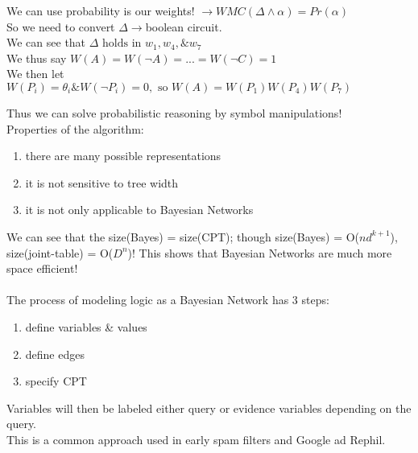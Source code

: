 \documentclass[../../lecture_notes.tex]{subfiles}
\begin{document}
\begin{center}\begin{minipage}{0.2\linewidth}\end{minipage}%
\begin{minipage}{0.8\linewidth}
\noindent We can use probability is our weights! $ \rightarrow WMC(\Delta\land\alpha) = Pr(\alpha)$\\
So we need to convert $\Delta \rightarrow$boolean circuit.\\
We can see that $\Delta \text{ holds in } w_1, w_4, \& w_7$\\
We thus say $W(A) = W(\neg A) = ... = W(\neg C) = 1$\\
We then let $W(P_i) = \theta_i \& W(\neg P_i) = 0, \text{ so } W(A) = W(P_1) W(P_4) W(P_7)$\\
\end{minipage}\end{center}

Thus we can solve probabilistic reasoning by symbol manipulations!\\
Properties of the algorithm:
	\begin{enumerate} [itemsep=0mm]
		\item there are many possible representations
		\item it is not sensitive to tree width
		\item it is not only applicable to Bayesian Networks
	\end{enumerate} \medskip

\noindent We can see that the size(Bayes) = size(CPT);
	though size(Bayes) = O($nd^{k+1}$), size(joint-table) = O($D^n$)!
This shows that Bayesian Networks are much more space efficient!\\
\\
The process of modeling logic as a Bayesian Network has 3 steps:
\begin{enumerate} [itemsep=0mm]
	\item define variables \& values
	\item define edges
	\item specify CPT
\end{enumerate} 

\noindent Variables will then be labeled either query or evidence variables depending on the query.\\
This is a common approach used in early spam filters and Google ad Rephil.
\end{document}
